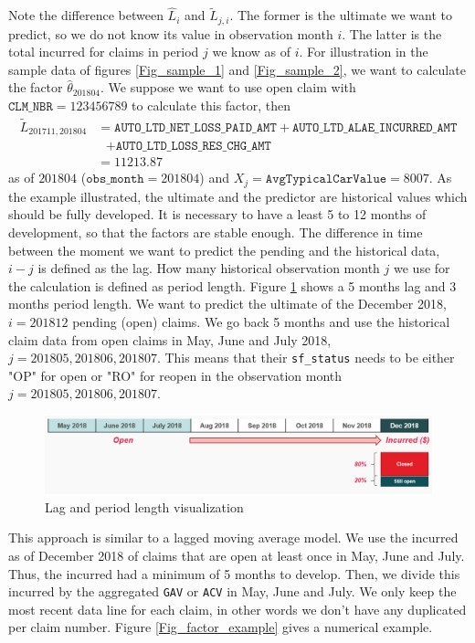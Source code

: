 	Note the difference between $\hat{L}_i$ and $\widetilde{L}_{j,i}$. The former is the ultimate we want to predict, so we do not know its value in observation month $i$. The latter is the total incurred for claims in period $j$ we know as of $i$. For illustration in the sample data of figures \ref{Fig_sample_1} and \ref{Fig_sample_2}, we want to calculate the factor $\hat{\theta}_{201804}$. We suppose we want to use open claim with $ \texttt{CLM\_NBR} = 123456789$ to calculate this factor, then 
	\begin{align*}
	\widetilde{L}_{201711, 201804} &= \texttt{AUTO\_LTD\_NET\_LOSS\_PAID\_AMT} + \texttt{AUTO\_LTD\_ALAE\_INCURRED\_AMT} \\
									& \ \ \	+ \texttt{AUTO\_LTD\_LOSS\_RES\_CHG\_AMT} \\
									&= 11213.87
	\end{align*}
	 as of $201804$ ($\texttt{obs\_month} = 201804$) and $X_j = \texttt{AvgTypicalCarValue} = 8007 $.
	As the example illustrated, the ultimate and the predictor are historical values which should be fully developed. It is necessary to have a least 5 to 12 months of development, so that the factors are stable enough. The difference in time between the moment we want to predict the pending and the historical data, $i - j$ is defined as the lag. How many historical observation month $j$ we use for the calculation is defined as period length. Figure \ref{Fig_lag_pl} shows a 5 months lag and 3 months period length. We want to predict the ultimate of the December 2018, $i = 201812$ pending (open) claims. We go back 5 months and use the historical claim data from open claims in May, June and July 2018, $j=201805, 201806, 201807$. This means that their \texttt{sf\_status} needs to be either "OP" for open or "RO" for reopen in the observation month $j=201805, 201806, 201807$.
	\begin{figure}[H]
		\begin{center}
			\includegraphics[scale=0.4]{Graphiques/lag_pl} 
			\renewcommand{\figurename}{Figure}
			\caption{Lag and period length visualization}\label{Fig_lag_pl}
		\end{center}
	\end{figure}
	This approach is similar to a lagged moving average model. We use the incurred as of December 2018 of claims that are open at least once in May, June and July. Thus, the incurred had a minimum of 5 months to develop. Then, we divide this incurred by the aggregated \texttt{GAV} or \texttt{ACV} in May, June and July. We only keep the most recent data line for each claim, in other words we don’t have any duplicated per claim number. Figure \ref{Fig_factor_example} gives a numerical example. 
